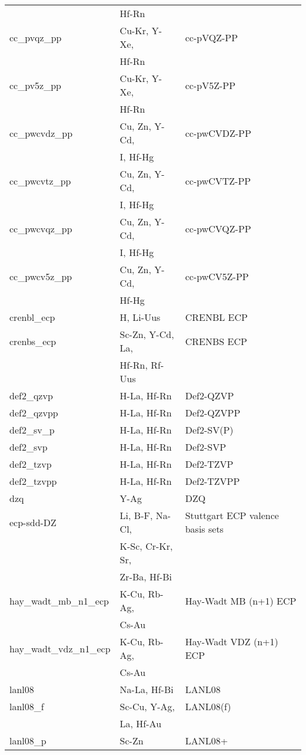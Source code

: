 \begin{longtable}{lll}
             & Hf-Rn &\\
cc\_pvqz\_pp & Cu-Kr, Y-Xe, & cc-pVQZ-PP\\
             & Hf-Rn &\\
cc\_pv5z\_pp & Cu-Kr, Y-Xe, & cc-pV5Z-PP\\
             & Hf-Rn &\\
cc\_pwcvdz\_pp & Cu, Zn, Y-Cd, & cc-pwCVDZ-PP\\
               & I, Hf-Hg &\\
cc\_pwcvtz\_pp & Cu, Zn, Y-Cd, & cc-pwCVTZ-PP\\
               & I, Hf-Hg &\\
cc\_pwcvqz\_pp & Cu, Zn, Y-Cd, & cc-pwCVQZ-PP\\
               & I, Hf-Hg &\\
cc\_pwcv5z\_pp & Cu, Zn, Y-Cd, & cc-pwCV5Z-PP\\
               & Hf-Hg &\\
crenbl\_ecp & H, Li-Uus & CRENBL ECP\\
crenbs\_ecp & Sc-Zn, Y-Cd, La, & CRENBS ECP\\
            & Hf-Rn, Rf-Uus &\\
def2\_qzvp & H-La, Hf-Rn & Def2-QZVP\\
def2\_qzvpp & H-La, Hf-Rn & Def2-QZVPP\\
def2\_sv\_p & H-La, Hf-Rn & Def2-SV(P)\\
def2\_svp & H-La, Hf-Rn & Def2-SVP\\
def2\_tzvp & H-La, Hf-Rn & Def2-TZVP\\
def2\_tzvpp & H-La, Hf-Rn & Def2-TZVPP\\
dzq & Y-Ag & DZQ\\
ecp-sdd-DZ & Li, B-F, Na-Cl, & Stuttgart ECP valence basis sets\\
           & K-Sc, Cr-Kr, Sr, &\\
           & Zr-Ba, Hf-Bi &\\
hay\_wadt\_mb\_n1\_ecp & K-Cu, Rb-Ag, & Hay-Wadt MB (n+1) ECP\\
                       & Cs-Au &\\
hay\_wadt\_vdz\_n1\_ecp & K-Cu, Rb-Ag, & Hay-Wadt VDZ (n+1) ECP\\
                        & Cs-Au &\\
lanl08 & Na-La, Hf-Bi & LANL08\\
lanl08\_f & Sc-Cu, Y-Ag, & LANL08(f)\\
          & La, Hf-Au &\\
lanl08\_p & Sc-Zn & LANL08+\\

\end{longtable}
